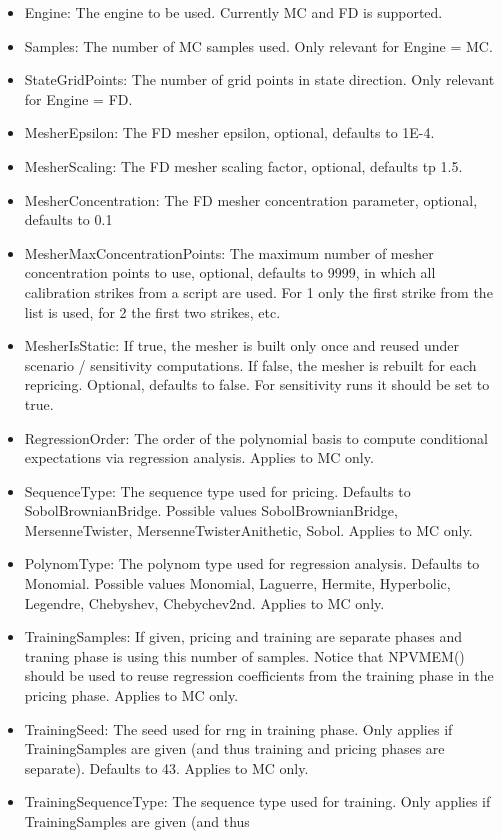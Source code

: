 \begin{itemize}
\item Engine: The engine to be used. Currently MC and FD is supported.
\item Samples: The number of MC samples used. Only relevant for Engine = MC.
\item StateGridPoints: The number of grid points in state direction. Only relevant for Engine = FD.
\item MesherEpsilon: The FD mesher epsilon, optional, defaults to 1E-4.
\item MesherScaling: The FD mesher scaling factor, optional, defaults tp 1.5.
\item MesherConcentration: The FD mesher concentration parameter, optional, defaults to 0.1
\item MesherMaxConcentrationPoints: The maximum number of mesher concentration points to use, optional, defaults to
  9999, in which all calibration strikes from a script are used. For 1 only the first strike from the list is used, for
  2 the first two strikes, etc.
\item MesherIsStatic: If true, the mesher is built only once and reused under scenario / sensitivity computations. If
  false, the mesher is rebuilt for each repricing. Optional, defaults to false. For sensitivity runs it should be set to
  true.
\item RegressionOrder: The order of the polynomial basis to compute conditional expectations via regression
  analysis. Applies to MC only.
\item SequenceType: The sequence type used for pricing. Defaults to SobolBrownianBridge. Possible values
  SobolBrownianBridge, MersenneTwister, MersenneTwisterAnithetic, Sobol. Applies to MC only.
\item PolynomType: The polynom type used for regression analysis. Defaults to Monomial. Possible values Monomial,
  Laguerre, Hermite, Hyperbolic, Legendre, Chebyshev, Chebychev2nd. Applies to MC only.
\item TrainingSamples: If given, pricing and training are separate phases and traning phase is using this number of
  samples. Notice that NPVMEM() should be used to reuse regression coefficients from the training phase in the pricing
  phase. Applies to MC only.
\item TrainingSeed: The seed used for rng in training phase. Only applies if TrainingSamples are given (and thus
  training and pricing phases are separate). Defaults to 43. Applies to MC only.
\item TrainingSequenceType: The sequence type used for training. Only applies if TrainingSamples are given (and thus

\end{itemize}
